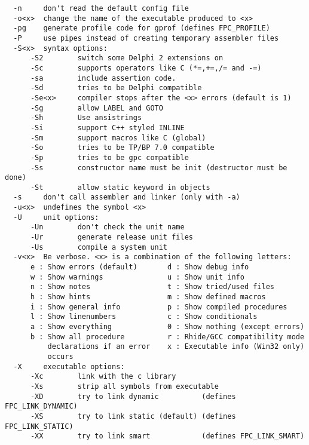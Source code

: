 \begin{verbatim}
  -n     don't read the default config file
  -o<x>  change the name of the executable produced to <x>
  -pg    generate profile code for gprof (defines FPC_PROFILE)
  -P     use pipes instead of creating temporary assembler files
  -S<x>  syntax options:
      -S2        switch some Delphi 2 extensions on
      -Sc        supports operators like C (*=,+=,/= and -=)
      -sa        include assertion code.
      -Sd        tries to be Delphi compatible
      -Se<x>     compiler stops after the <x> errors (default is 1)
      -Sg        allow LABEL and GOTO
      -Sh        Use ansistrings
      -Si        support C++ styled INLINE
      -Sm        support macros like C (global)
      -So        tries to be TP/BP 7.0 compatible
      -Sp        tries to be gpc compatible
      -Ss        constructor name must be init (destructor must be done)
      -St        allow static keyword in objects
  -s     don't call assembler and linker (only with -a)
  -u<x>  undefines the symbol <x>
  -U     unit options:
      -Un        don't check the unit name
      -Ur        generate release unit files
      -Us        compile a system unit
  -v<x>  Be verbose. <x> is a combination of the following letters:
      e : Show errors (default)       d : Show debug info
      w : Show warnings               u : Show unit info
      n : Show notes                  t : Show tried/used files
      h : Show hints                  m : Show defined macros
      i : Show general info           p : Show compiled procedures
      l : Show linenumbers            c : Show conditionals
      a : Show everything             0 : Show nothing (except errors)
      b : Show all procedure          r : Rhide/GCC compatibility mode
          declarations if an error    x : Executable info (Win32 only)
          occurs
  -X     executable options:
      -Xc        link with the c library
      -Xs        strip all symbols from executable
      -XD        try to link dynamic          (defines FPC_LINK_DYNAMIC)
      -XS        try to link static (default) (defines FPC_LINK_STATIC)
      -XX        try to link smart            (defines FPC_LINK_SMART)


\end{verbatim}
